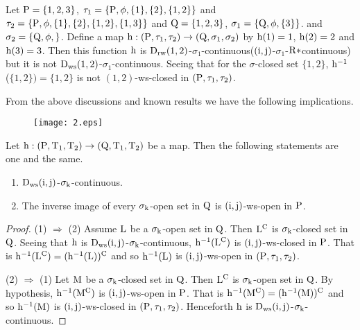 \begin{exm}\label{exam8.5.12}
Let $\mathrm{P}=\{1,2,3\}$, $\tau_1 =\{\mathrm{P}, \phi, \{1\}, \{2\}, \{1,2\}\}$ and $\tau_2 =\{\TSP, \phi, \{1\},\break \{2\},\{1,2\},\{1,3\}\}$ and $\mathrm{Q}=\{1,2,3\}$, $\sigma_{1} =\{\mathrm{Q}, \phi, \{3\}\}$. and $\sigma_{2} =\{\mathrm{Q}, \phi, \}$. Define a map $\mathrm{h}:(\mathrm{P}, \tau_1, \tau_2 )\to (\mathrm{Q}, \sigma_{1}, \sigma_{2} )$ by $\mathrm{h}(1)=1$, $\mathrm{h}(2)=2$ and $\mathrm{h}(3)=3$. Then this function $\mathrm{h}$ is $\mathrm{D}_{\mathrm{rw}} (1, 2)$-$\sigma_{1}$-continuous($(\mathrm{i}, \mathrm{j})$-$\sigma_{1}$-$\mathrm{R}*$continuous) but it is not $\mathrm{D}_{\mathrm{ws}} (1, 2)$-$\sigma_{1}$-continuous. Seeing that for the $\sigma$-closed set $\{1,2\}$, $\mathrm{h}^{-1}$ ($\{1,2\})=\{1,2\}$ is not $(1, 2)$-ws-closed in $(\mathrm{P}, \tau_1, \tau_2 )$.
\end{exm}

\begin{rem}\label{rem8.5.3}
From the above discussions and known results we have the following implications.
\begin{figure}[H]
\centering
\texttt{[image: 2.eps]}
\end{figure}
\end{rem}

\begin{thm}\label{thm8.5.11}
Let $\mathrm{h}:(\mathrm{P},\mathrm{T}_{1},\mathrm{T}_{2})\to (\mathrm{Q},\mathrm{T}_{1},\mathrm{T}_{2})$ be a map. Then the following statements are one and the same.
\begin{enumerate}[(1)]
\item $\mathrm{D}_{\mathrm{ws}} (\mathrm{i}, \mathrm{j})$-$\sigma_{\mathrm{k}}$-continuous.

\item The inverse image of every $\sigma_{\mathrm{k}}$-open set in $\mathrm{Q}$ is $(\mathrm{i}, \mathrm{j})$-ws-open in $\mathrm{P}$.
\end{enumerate}
\end{thm}

\begin{proof}
(1) $\Rightarrow$  (2) Assume $\mathrm{L}$ be a $\sigma_{\mathrm{k}}$-open set in $\mathrm{Q}$. Then $\mathrm{L}^{\text{C}}$ is $\sigma_{\mathrm{k}}$-closed set in $\mathrm{Q}$. Seeing that $\mathrm{h}$ is $\mathrm{D}_{\mathrm{ws}}(\mathrm{i}, \mathrm{j})$-$\sigma_{\mathrm{k}}$-continuous, $\mathrm{h}^{-1} (\mathrm{L}^{\text{C}})$ is $(\mathrm{i}, \mathrm{j})$-ws-closed in $\mathrm{P}$. That is $\mathrm{h}^{-1} (\mathrm{L}^{\text{C}})=(\mathrm{h}^{-1} (\mathrm{L}))^{\text{C}}$ and so $\mathrm{h}^{-1} (\mathrm{L})$ is $(\mathrm{i}, \mathrm{j})$-ws-open in $(\mathrm{P}, \tau_1, \tau_2 )$.

(2) $\Rightarrow$  (1) Let $\mathrm{M}$ be a $\sigma_{\mathrm{k}}$-closed set in $\mathrm{Q}$. Then $\mathrm{L}^{\text{C}}$ is $\sigma_{\mathrm{k}}$-open set in $\mathrm{Q}$. By hypothesis, $\mathrm{h}^{-1} (\mathrm{M}^{\text{C}})$ is $(\mathrm{i}, \mathrm{j})$-ws-open in $\mathrm{P}$. That is $\mathrm{h}^{-1} (\mathrm{M}^{\text{C}}) = (\mathrm{h}^{-1} (\mathrm{M}))^{\text{C}}$ and so $\mathrm{h}^{-1} (\mathrm{M})$ is $(\mathrm{i}, \mathrm{j})$-ws-closed in $(\mathrm{P}, \tau_1, \tau_2 )$. Henceforth $\mathrm{h}$ is $\mathrm{D}_{\mathrm{ws}}(\mathrm{i}, \mathrm{j})$-$\sigma_{\mathrm{k}}$-continuous.
\end{proof}

